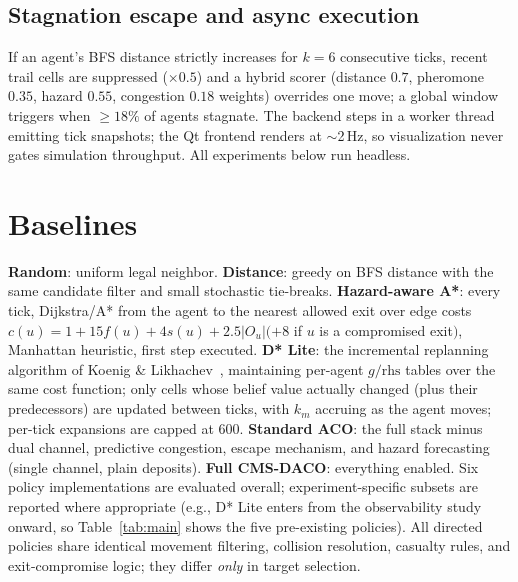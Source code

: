 ﻿\documentclass[conference]{IEEEtran}
\begin{document}
\subsection{Stagnation escape and async execution}
If an agent's BFS distance strictly increases for $k{=}6$ consecutive ticks, recent trail cells are suppressed ($\times0.5$) and a hybrid scorer (distance $0.7$, pheromone $0.35$, hazard $0.55$, congestion $0.18$ weights) overrides one move; a global window triggers when $\geq18\%$ of agents stagnate. The backend steps in a worker thread emitting tick snapshots; the Qt frontend renders at $\sim$2\,Hz, so visualization never gates simulation throughput. All experiments below run headless.

\section{Baselines}
\textbf{Random}: uniform legal neighbor. \textbf{Distance}: greedy on BFS distance with the same candidate filter and small stochastic tie-breaks. \textbf{Hazard-aware A*}: every tick, Dijkstra/A* from the agent to the nearest allowed exit over edge costs $c(u)=1+15f(u)+4s(u)+2.5|O_u|(+8$ if $u$ is a compromised exit$)$, Manhattan heuristic, first step executed. \textbf{D* Lite}: the incremental replanning algorithm of Koenig \& Likhachev~\cite{koenig2002}, maintaining per-agent $g/\mathrm{rhs}$ tables over the same cost function; only cells whose belief value actually changed (plus their predecessors) are updated between ticks, with $k_m$ accruing as the agent moves; per-tick expansions are capped at 600. \textbf{Standard ACO}: the full stack minus dual channel, predictive congestion, escape mechanism, and hazard forecasting (single channel, plain deposits). \textbf{Full CMS-DACO}: everything enabled. Six policy implementations are evaluated overall; experiment-specific subsets are reported where appropriate (e.g., D* Lite enters from the observability study onward, so Table~\ref{tab:main} shows the five pre-existing policies). All directed policies share identical movement filtering, collision resolution, casualty rules, and exit-compromise logic; they differ \emph{only} in target selection.
\end{document}
